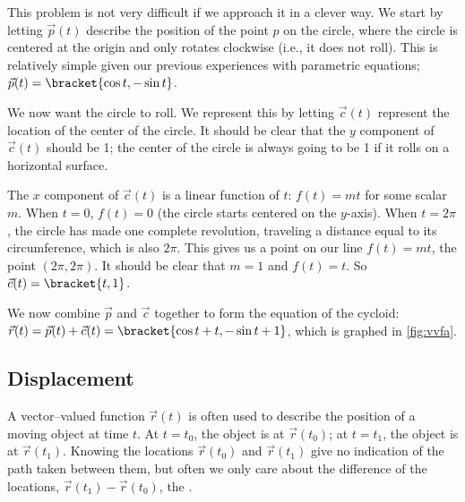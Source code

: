 {This problem is not very difficult if we approach it in a clever way. We start by letting $\vec p(t)$ describe the position of the point $p$ on the circle, where the circle is centered at the origin and only rotates clockwise (i.e., it  does not roll). This is relatively simple given our previous experiences with parametric equations; $\vec p(t) =\bracket{\cos t, -\sin t}$. 

We now want the circle to roll. We represent this by letting $\vec c(t)$ represent the location of the center of the circle. It should be clear that the $y$ component of $\vec c(t)$ should be 1; the center of the circle is always going to be 1 if it rolls on a horizontal surface.

The $x$ component of $\vec c(t)$ is a linear function of $t$: $f(t) = mt$ for some scalar $m$. When $t=0$, $f(t) = 0$ (the circle starts centered on the $y$-axis). When $t=2\pi$, the circle has made one complete revolution, traveling a distance equal to its circumference, which is also $2\pi$. This gives us a point on our line $f(t) = mt$, the point $(2\pi, 2\pi)$. It should be clear that $m=1$ and $f(t) = t$. So $\vec c(t) =\bracket{t, 1}$. 

We now combine $\vec p$ and $\vec c$ together to form the equation of the cycloid: $\vec r(t) = \vec p(t) + \vec c(t) =\bracket{\cos t+ t,-\sin t+1}$, which is graphed in \autoref{fig:vvfa}.}

\subsection*{Displacement}


A vector--valued function $\vec r(t)$ is often used to describe the position of a moving object at time $t$. At $t=t_0$, the object is at $\vec r(t_0)$; at $t=t_1$, the object is at $\vec r(t_1)$. Knowing the locations $\vec r(t_0)$ and $\vec r(t_1)$ give no indication of the path taken between them, but often we only care about the difference of the locations, $\vec r(t_1)-\vec r(t_0)$, the .

